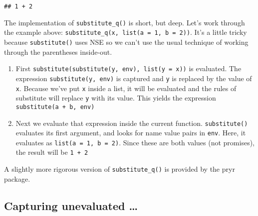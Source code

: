\begin{Shaded}
\begin{Highlighting}[]
\StringTok{ }
\StringTok{ }\NormalTok{(}\NormalTok{(}
\NormalTok{\}}

\StringTok{ }\OperatorTok{+}\StringTok{ }
\NormalTok{(} \NormalTok{, } \NormalTok{))}
\end{Highlighting}
\end{Shaded}

\begin{verbatim}
## 1 + 2
\end{verbatim}

The implementation of \texttt{substitute\_q()} is short, but deep. Let's
work through the example above:
\texttt{substitute\_q(x,\ list(a\ =\ 1,\ b\ =\ 2))}. It's a little
tricky because \texttt{substitute()} uses NSE so we can't use the usual
technique of working through the parentheses inside-out.

\begin{enumerate}
\def\labelenumi{\arabic{enumi}.}
\item
  First \texttt{substitute(substitute(y,\ env),\ list(y\ =\ x))} is
  evaluated. The expression \texttt{substitute(y,\ env)} is captured and
  \texttt{y} is replaced by the value of \texttt{x}. Because we've put
  \texttt{x} inside a list, it will be evaluated and the rules of
  substitute will replace \texttt{y} with its value. This yields the
  expression \texttt{substitute(a\ +\ b,\ env)}
\item
  Next we evaluate that expression inside the current function.
  \texttt{substitute()} evaluates its first argument, and looks for name
  value pairs in \texttt{env}. Here, it evaluates as
  \texttt{list(a\ =\ 1,\ b\ =\ 2)}. Since these are both values (not
  promises), the result will be \texttt{1\ +\ 2}
\end{enumerate}

A slightly more rigorous version of \texttt{substitute\_q()} is provided
by the pryr package.

\hypertarget{capturing-dots}{%
\subsection{Capturing unevaluated \ldots{}}\label{capturing-dots}}

